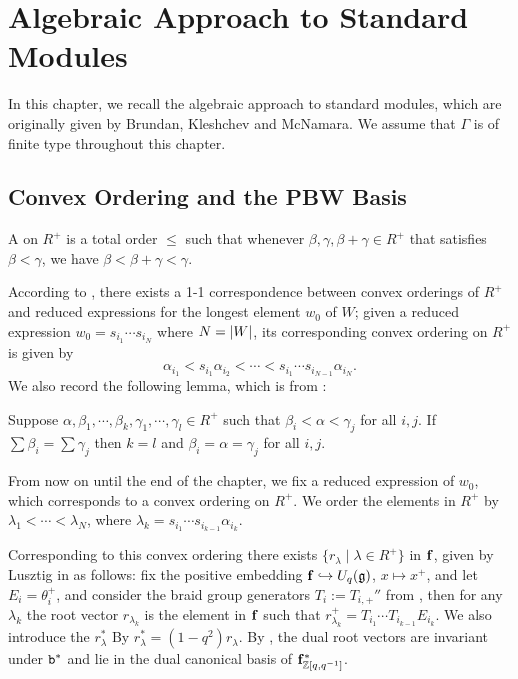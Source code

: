 \chapter{Algebraic Approach to Standard Modules}

In this chapter, we recall the algebraic approach to standard modules,
which are originally given by Brundan, Kleshchev and McNamara.
We assume that $\Gamma$ is of finite type throughout this chapter.

\section{Convex Ordering and the PBW Basis}

A  on $R^+$ is a total order $\le$ such that
whenever $\beta,\gamma,\beta+\gamma\in R^+$ that satisfies
$\beta<\gamma$, we have $\beta<\beta+\gamma<\gamma$.

According to \cite{P}, there exists a 1-1 correspondence between convex orderings
of $R^+$ and reduced expressions for the longest element $w_0$ of $W$;
given a reduced expression $w_0 = s_{i_1}\cdots s_{i_N}$ where $N = \left|W\right|$,
its corresponding convex ordering on $R^+$ is given by
\[
    \alpha_{i_1}<s_{i_1}\alpha_{i_2}<\cdots<s_{i_1}\cdots s_{i_{N-1}}\alpha_{i_N}.
\]    
We also record the following lemma, which is from \cite[Lemma 2.4]{BKM}:

\begin{lemma}\label{sum-in-convex-ordering}
    Suppose $\alpha,\beta_1,\cdots,\beta_k,\gamma_1,\cdots,\gamma_l\in R^+$
    such that $\beta_i<\alpha<\gamma_j$ for all $i,j$. If $\sum\beta_i = \sum\gamma_j$
    then $k = l$ and $\beta_i = \alpha = \gamma_j$ for all $i,j$.
\end{lemma}

From now on until the end of the chapter, we fix a reduced expression of $w_0$,
which corresponds to a convex ordering on $R^+$. We order the elements in $R^+$
by $\lambda_1<\cdots<\lambda_N$, where 
$\lambda_k = s_{i_1}\cdots s_{i_{k-1}}\alpha_{i_k}$. 

Corresponding to this convex ordering
there exists  $\{r_\lambda\mid\lambda\in R^+\}$ in $\mathbf{f}$,
given by Lusztig in \cite{L} as follows: fix the positive embedding 
$\mathbf{f}\hookrightarrow U_q(\mathfrak{g})$, $x\mapsto x^+$, and let $E_i = \theta_i^+$,
and consider the braid group generators $T_i := T_{i,+}''$ from 
\cite[37.1.3]{L}, then for any $\lambda_k$ the root vector $r_{\lambda_k}$
is the element in $\mathbf{f}$ such that $r_{\lambda_k}^+ = T_{i_1}\cdots T_{i_{k-1}}
E_{i_k}$. We also introduce the  $r^*_\lambda$ By
$r^*_\lambda = (1-q^2)r_\lambda$. By \cite[37.2.4]{L}, the dual root vectors
are invariant under $\mathtt{b}^*$ and lie in the dual canonical basis of 
$\mathbf{f}^*_{\mathbb{Z}[q,q^{-1}]}$. 

